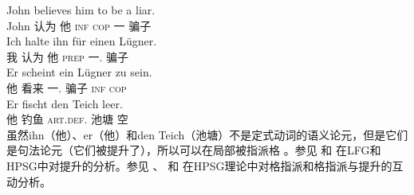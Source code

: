 \eal
\ex 
\gll John believes him to be a liar.\\
	 John 认为 他 \textsc{inf} \textsc{cop} 一 骗子\\
\ex 
\gll Ich halte ihn für einen Lügner.\\
	我 认为 他 \textsc{prep} 一.\acc{} 骗子\\
\ex 
\gll Er scheint ein Lügner zu sein.\\
	 他 看来 一.\nom{} 骗子 \textsc{inf} \textsc{cop}\\
\ex 
\gll Er fischt den Teich leer.\\
	 他 钓鱼 \textsc{art}.\textsc{def}.\acc{} 池塘 空\\
\zl
虽然ihn（他）、er（他）和den Teich（池塘）不是定式动词的语义论元，但是它们是句法论元（它们被提升了），所以可以在局部被指派格 。参见 和 在LFG\indexlfgc 和HPSG\indexhpsgc 中对提升的分析。参见 、 和 在HPSG理论中对格指派和格指派与提升的互动分析。

